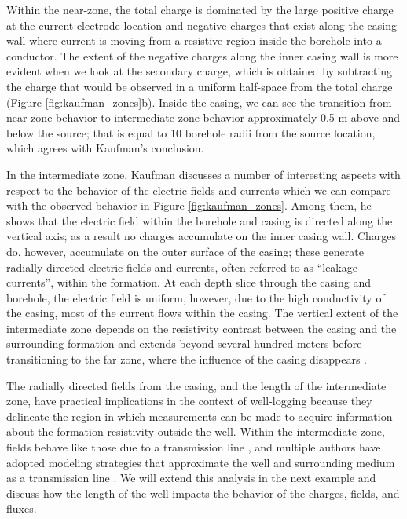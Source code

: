 \documentclass[preprint,review,3p,times,onecolumn,authoryear]{elsarticle}
\begin{document}
Within the near-zone, the total charge is dominated by the large positive charge at the current electrode location and negative charges that exist along the casing wall where current is moving from a resistive region inside the borehole into a conductor. The extent of the negative charges along the inner casing wall is more evident when we look at the secondary charge, which is obtained by subtracting the charge that would be observed in a uniform half-space from the total charge (Figure \ref{fig:kaufman_zones}b). Inside the casing, we can see the transition from near-zone behavior to intermediate zone behavior approximately 0.5 m above and below the source; that is equal to 10 borehole radii from the source location, which agrees with Kaufman's conclusion.

In the intermediate zone, Kaufman discusses a number of interesting aspects with respect to  the behavior of the electric fields and currents which we can compare with the observed behavior in Figure \ref{fig:kaufman_zones}. Among them, he shows that the electric field within the borehole and casing is directed along the vertical axis; as a result no charges accumulate on the inner casing wall. Charges do, however, accumulate on the outer surface of the casing; these  generate radially-directed electric fields and currents, often referred to as “leakage currents”, within the formation. At each depth slice through the casing and borehole, the electric field is uniform, however, due to the high conductivity of the casing, most of the current flows within the casing.  The vertical extent of the intermediate zone depends on the resistivity contrast between the casing and the surrounding formation and extends beyond several hundred meters before transitioning to the far zone, where the influence of the casing disappears \citep{Kaufman1990}.




The radially directed fields from the casing, and the length of the intermediate zone, have practical implications in the context of well-logging because they delineate the region in which measurements can be made to acquire information about the formation resistivity outside the well. Within the intermediate zone, fields behave like those due to a transmission line \citep{Kaufman1990}, and multiple authors have adopted modeling strategies that approximate the well and surrounding medium as a transmission line \citep{Kong2009, Aldridge2015}. We will extend this analysis in the next example and discuss how the length of the well impacts the behavior of the charges, fields, and fluxes.
\end{document}
